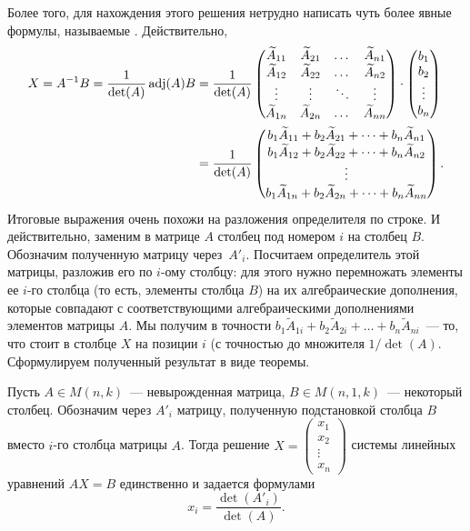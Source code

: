 Более того, для нахождения этого решения нетрудно написать чуть более
явные формулы, называемые .
Действительно,
\begin{align*}
X = A^{-1}B = \frac{1}{\det(A)}\operatorname{adj}(A)B &= 
\frac{1}{\det(A)}
\begin{pmatrix}
\widetilde{A}_{11} & \widetilde{A}_{21} & \dots & \widetilde{A}_{n1}\\
\widetilde{A}_{12} & \widetilde{A}_{22} & \dots & \widetilde{A}_{n2}\\
\vdots & \vdots & \ddots & \vdots\\
\widetilde{A}_{1n} & \widetilde{A}_{2n} & \dots & \widetilde{A}_{nn}
\end{pmatrix}\cdot
\begin{pmatrix}
b_1 \\ b_2 \\ \vdots \\ b_n
\end{pmatrix}\\
&=
\frac{1}{\det(A)}
\begin{pmatrix}
b_1\widetilde{A}_{11} + b_2\widetilde{A}_{21} + \dots +
b_n\widetilde{A}_{n1}\\
b_1\widetilde{A}_{12} + b_2\widetilde{A}_{22} + \dots +
b_n\widetilde{A}_{n2}\\
\vdots\\
b_1\widetilde{A}_{1n} + b_2\widetilde{A}_{2n} + \dots +
b_n\widetilde{A}_{nn}
\end{pmatrix}.
\end{align*}
Итоговые выражения очень похожи на разложения определителя по строке.
И действительно, заменим в матрице $A$ столбец под номером $i$ на
столбец $B$. Обозначим полученную матрицу через~$A'_i$.
Посчитаем определитель этой матрицы, разложив его по $i$-ому столбцу:
для этого нужно перемножать элементы ее $i$-го столбца (то есть,
элементы столбца $B$) на их алгебраические дополнения, которые
совпадают с соответствующими алгебраическими дополнениями элементов
матрицы $A$. Мы получим в точности $b_1\widetilde{A}_{1i} +
b_2\widetilde{A}_{2i} + \dots + b_n\widetilde{A}_{ni}$~--- то, что
стоит в столбце $X$ на позиции $i$ (с точностью до множителя
$1/\det(A)$. Сформулируем полученный результат в виде теоремы.

\begin{theorem}
Пусть $A\in M(n,k)$~--- невырожденная матрица, $B\in M(n,1,k)$~---
некоторый столбец. Обозначим через $A'_i$ матрицу, полученную
подстановкой столбца $B$ вместо $i$-го столбца матрицы $A$.
Тогда решение $X=\begin{pmatrix}x_1\\x_2\\\vdots\\x_n\end{pmatrix}$
системы линейных уравнений $AX=B$ единственно и задается формулами
$$
x_i=\frac{\det(A'_i)}{\det(A)}.
$$
\end{theorem}


